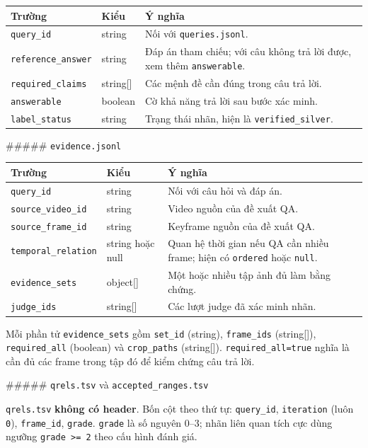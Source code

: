 \documentclass[12pt,a4paper,onecolumn]{article}
\begin{document}
\begin{center}
\begin{tabular}{l l l}
\toprule
Trường & Kiểu & Ý nghĩa \\
\midrule
\texttt{query\_id} & string & Nối với \texttt{queries.jsonl}. \\
\texttt{reference\_answer} & string & Đáp án tham chiếu; với câu không trả lời được, xem thêm \texttt{answerable}. \\
\texttt{required\_claims} & string[] & Các mệnh đề cần đúng trong câu trả lời. \\
\texttt{answerable} & boolean & Cờ khả năng trả lời sau bước xác minh. \\
\texttt{label\_status} & string & Trạng thái nhãn, hiện là \texttt{verified\_silver}. \\
\bottomrule
\end{tabular}
\end{center}


\#\#\#\#\# \texttt{evidence.jsonl}

\begin{center}
\begin{tabular}{l l l}
\toprule
Trường & Kiểu & Ý nghĩa \\
\midrule
\texttt{query\_id} & string & Nối với câu hỏi và đáp án. \\
\texttt{source\_video\_id} & string & Video nguồn của đề xuất QA. \\
\texttt{source\_frame\_id} & string & Keyframe nguồn của đề xuất QA. \\
\texttt{temporal\_relation} & string hoặc null & Quan hệ thời gian nếu QA cần nhiều frame; hiện có \texttt{ordered} hoặc \texttt{null}. \\
\texttt{evidence\_sets} & object[] & Một hoặc nhiều tập ảnh đủ làm bằng chứng. \\
\texttt{judge\_ids} & string[] & Các lượt judge đã xác minh nhãn. \\
\bottomrule
\end{tabular}
\end{center}


Mỗi phần tử \texttt{evidence\_sets} gồm \texttt{set\_id} (string), \texttt{frame\_ids} (string[]), \texttt{required\_all} (boolean) và \texttt{crop\_paths} (string[]). \texttt{required\_all=true} nghĩa là cần đủ các frame trong tập đó để kiểm chứng câu trả lời.

\#\#\#\#\# \texttt{qrels.tsv} và \texttt{accepted\_ranges.tsv}

\texttt{qrels.tsv} \textbf{không có header}. Bốn cột theo thứ tự: \texttt{query\_id}, \texttt{iteration} (luôn \texttt{0}), \texttt{frame\_id}, \texttt{grade}. \texttt{grade} là số nguyên 0–3; nhãn liên quan tích cực dùng ngưỡng \texttt{grade >= 2} theo cấu hình đánh giá.
\end{document}
